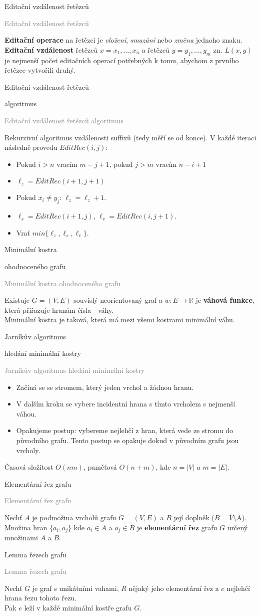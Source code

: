 \documentclass[20pt]{extarticle}
\newcommand{\card}[3][]{
	\vspace*{\fill}

	\newpage
	\topskip0pt
	\vspace*{\fill}
		\Large #2

		\vspace{1cm}
		\normalsize #1
	\vspace*{\fill}
	\newpage

	\small \textcolor{gray}{#2 #1}
	\topskip0pt
	\vspace*{\fill}

	\normalsize
	#3
	\vspace*{\fill}
}
\newcommand{\pair}[2]{\left(#1, #2\right)}
\newcommand{\graph}{G=\pair{V}{E}}
\begin{document}
\begin{center}
\card{Editační vzdálenost řetězců}{
	\textbf{Editační operace} na řetězci je \textit{vložení}, \textit{smazání} nebo
	\textit{změna} jednoho znaku.
	\\\textbf{Editační vzdálenost} řetězců $x=x_1, \dots, x_n$
	a řetězců $y=y_1, \dots, y_m$ zn. $L(x, y)$ je nejmenší počet editačních operací
	potřebných k tomu, abychom z prvního řetězce vytvořili druhý.
}

\card[algoritmus]{Editační vzdálenost řetězců}{
	\small
	Rekurzivní algoritmus vzdálenosti suffixů (tedy měří se od konce). V každé iteraci
	následně provedu $EditRec(i,j)$:
	\begin{itemize}
		\item Pokud $i > n$ vracím $m-j+1$, pokud $j > m$ vracím $n-i+1$
		\item $\ell_{z} = EditRec(i+1, j+1)$
		\item Pokud $x_i \neq y_j$: $\ell_z = \ell_z + 1$.
		\item $\ell_s = EditRec(i+1, j)$, $\ell_v = EditRec(i, j+1)$.
		\item Vrať $min\{\ell_z, \ell_s, \ell_v\}$.
	\end{itemize}
	\normalsize
}

\card[ohodnoceného grafu]{Minimální kostra}{
	Existuje $\graph$ souvislý neorientovaný graf a $w: E \to \mathbb{R}$ je \textbf{váhová funkce},
	která přiřazuje hranám čísla - váhy.\\
	Minimální kostra je taková, která má mezi všemi kostrami minimální váhu.
}

\card[hledání minimální kostry]{Jarníkův algoritmus}{
	\small
	\begin{itemize}
		\item Začíná se se stromem, který jeden vrchol a žádnou hranu.
		\item V dalším kroku se vybere incidentní hrana s tímto vrcholem s nejmenší váhou.
		\item Opakujeme postup: vybereme nejlehčí z hran, která vede ze stromu do původního grafu.
		Tento postup se opakuje dokud v původním grafu jsou vrcholy.
	\end{itemize}
	Časová složitost $O(nm)$, paměťová $O(n+m)$, kde $n=|V|$ a $m=|E|$.
	\normalsize
}

\card{Elementární řez grafu}{
	Nechť $A$ je podmožina vrcholů grafu $\graph$ a $B$ její doplněk ($B=V\setminus$A).
	Množina hran $\{a_i, a_j\}$ kde $a_i \in A$ a $a_j \in B$ je \textbf{elementární řez}
	grafu $G$ určený množinami $A$ a $B$.
}

\card{Lemma řezech grafu}{
	Nechť $G$ je graf s unikátními vahami, $R$ nějaký jeho elementární řez a $e$ nejlehčí
	hrana řezu tohoto řezu.\\
	Pak $e$ leží v každé minimální kostře grafu $G$.
}


\end{center}
\end{document}
